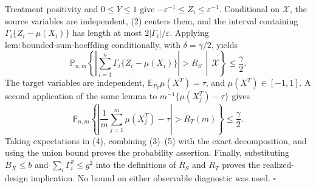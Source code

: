 Treatment positivity and \(0\le Y\le1\) give \(-\varepsilon^{-1}\le Z_i\le\varepsilon^{-1}\). Conditional on \(\mathscr X\), the source variables are independent, (2) centers them, and the interval containing \(\Gamma_i\{Z_i-\mu(X_i)\}\) has length at most \(2|\Gamma_i|/\varepsilon\). Applying \(\mathrm{lem:bounded\text{-}sum\text{-}hoeffding}\) conditionally, with \(\delta=\gamma/2\), yields
\[
\mathbb P_{n,m}\!\left\{
\left|\sum_{i=1}^n\Gamma_i\{Z_i-\mu(X_i)\}\right|>R_S
\,\middle|\,\mathscr X\right\}\le\frac\gamma2.
\tag{4}
\]
The target variables are independent, \(\mathbb E_{P_T}\mu(X^T)=\tau\), and \(\mu(X^T)\in[-1,1]\). A second application of the same lemma to \(m^{-1}\{\mu(X_j^T)-\tau\}\) gives
\[
\mathbb P_{n,m}\!\left\{
\left|\frac1m\sum_{j=1}^m\mu(X_j^T)-\tau\right|>R_T(m)
\right\}\le\frac\gamma2.
\tag{5}
\]
Taking expectations in (4), combining (3)--(5) with the exact decomposition, and using the union bound proves the probability assertion. Finally, substituting \(B_X\le b\) and \(\sum_i\Gamma_i^2\le g^2\) into the definitions of \(R_S\) and \(R_T\) proves the realized-design implication. No bound on either observable diagnostic was used. \(\square\)